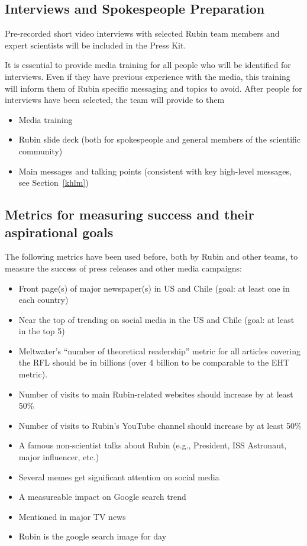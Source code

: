 \subsection{Interviews and Spokespeople Preparation \label{interviews}} 

Pre-recorded short video interviews with selected Rubin team members and expert scientists will be included
in the Press Kit.

It is essential to provide media training for all people who will be identified for interviews. Even if they have
previous experience with the media, this training will inform them of Rubin specific messaging and topics to avoid.
After people for interviews have been selected, the team will provide to them
\begin{itemize}
\item Media training
\item Rubin slide deck (both for spokespeople and general members of the scientific community)
\item Main messages and talking points (consistent with key high-level messages, see Section~\ref{khlm})
\end{itemize} 





\subsection{Metrics for measuring success and their aspirational goals}

The following metrics have been used before, both by Rubin and other teams, to measure
the success of press releases and other media campaigns:
\begin{itemize}
\item Front page(s) of major newspaper(s) in US and Chile (goal: at least one in each country)
\item Near the top of trending on social media in the US and Chile (goal: at least in the top 5)
\item Meltwater’s ``number of theoretical readership'' metric for all articles covering the RFL
               should be in billions (over 4 billion to be comparable to the EHT metric).
\item Number of visits to main Rubin-related websites should increase by at least 50\%
\item Number of visits to Rubin's YouTube channel should increase by at least 50\%
\item A famous non-scientist talks about Rubin (e.g., President, ISS Astronaut, major influencer, etc.)
\item Several memes get significant attention on social media
\item A measureable impact on Google search trend
\item Mentioned in major TV news
\item Rubin is the google search image for day
\end{itemize}

